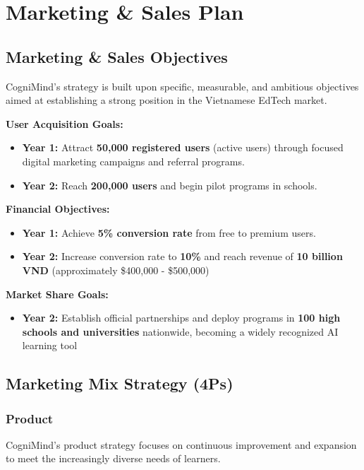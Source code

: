 \section{Marketing \& Sales Plan}

\subsection{Marketing \& Sales Objectives}
CogniMind's strategy is built upon specific, measurable, and ambitious objectives aimed at establishing a strong position
in the Vietnamese EdTech market.

\textbf{User Acquisition Goals:}
\begin{itemize}
    \item \textbf{Year 1:} 
        Attract \textbf{50,000 registered users} (active users) through focused digital marketing campaigns and referral 
        programs.
    \item \textbf{Year 2:}
        Reach \textbf{200,000 users} and begin pilot programs in schools.
\end{itemize}

\textbf{Financial Objectives:}
\begin{itemize}
    \item \textbf{Year 1:}
        Achieve \textbf{5\% conversion rate} from free to premium users.
    \item \textbf{Year 2:}
        Increase conversion rate to \textbf{10\%} and reach revenue of \textbf{10 billion VND}
        (approximately \$400,000 - \$500,000)
\end{itemize}

\textbf{Market Share Goals:}
\begin{itemize}
    \item \textbf{Year 2:} Establish official partnerships and deploy programs in
    \textbf{100 high schools and universities} nationwide, becoming a widely recognized AI learning tool
\end{itemize}

\subsection{Marketing Mix Strategy (4Ps)}
\subsubsection{Product}
CogniMind's product strategy focuses on continuous improvement and expansion to meet the increasingly diverse needs of learners.

